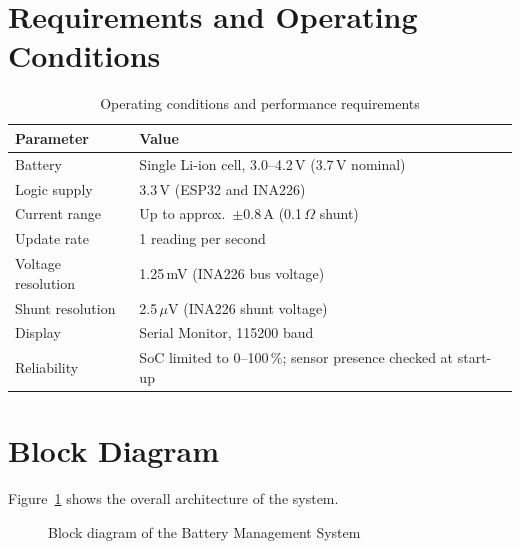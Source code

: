 \documentclass[12pt,a4paper,oneside]{report}
\begin{document}
\section{Requirements and Operating Conditions}
\begin{table}[H]
\centering
\caption{Operating conditions and performance requirements}
\label{tab:req}
\begin{tabularx}{\linewidth}{lX}
\toprule
\textbf{Parameter} & \textbf{Value} \\
\midrule
Battery & Single Li-ion cell, 3.0--4.2\,V (3.7\,V nominal) \\
Logic supply & 3.3\,V (ESP32 and INA226) \\
Current range & Up to approx.\ $\pm$0.8\,A (0.1\,$\Omega$ shunt) \\
Update rate & 1 reading per second \\
Voltage resolution & 1.25\,mV (INA226 bus voltage) \\
Shunt resolution & 2.5\,$\mu$V (INA226 shunt voltage) \\
Display & Serial Monitor, 115200 baud \\
Reliability & SoC limited to 0--100\,\%; sensor presence checked at start-up \\
\bottomrule
\end{tabularx}
\end{table}

\section{Block Diagram}
Figure~\ref{fig:block} shows the overall architecture of the system.

\begin{figure}[H]
\centering
{}
\caption{Block diagram of the Battery Management System}
\label{fig:block}
\end{figure}
\end{document}
